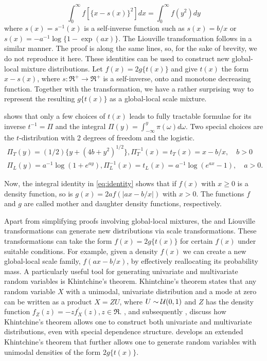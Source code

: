\documentclass[lineno]{biometrika}
\begin{document}
\begin{equation}
  \int_0^\infty f\left[ \{x-s(x)\}^2 \right] dx =  \int_0^\infty f( y^2 ) dy \label{eq:gen}
\end{equation}
where $s(x)=s^{-1}(x)$ is a self-inverse function such as $s(x) = b/x$ or $s(x) = -a^{-1}\log\{1-\exp(a x)\}$. The Liouville transformation follows in a
similar manner.  The proof is along the same lines, so, for the sake of brevity, we do not reproduce it here. These identities can be used to construct new global-local mixture distributions. 
Let $f(x) = 2g\{ t(x) \}$ and give $t(x)$ the form $x-s(x)$, where $s : \Re^+ \to \Re^+$ is a self-inverse, onto and monotone decreasing function. Together with the \CS{} transformation, we have a rather surprising way to represent the resulting $g\{t(x)\}$ as a global-local scale mixture. 

\citet{jones_generating_2014} shows that only a few choices of $t(x)$ leads to fully tractable formulae for its inverse $t^{-1}= \Pi$ and the integral 
$\Pi(y) = \int_{-\infty}^{y} \pi(\omega) d\omega$. Two special choices are the $t$-distribution with 2 degrees of freedom and the logistic. 
\begin{align*}
\Pi_{T}(y) = (1/2)\{ y+(4b+y^2)^{1/2}\}, \Pi_T^{-1}(x) = t_T(x) = x - b/x, \quad b >0\\
\Pi_{L}(y) = a^{-1} \log(1+e^{ay}), \Pi_L^{-1}(x) = t_L(x) = a^{-1} \log(e^{ax}-1), \quad a>0.
\end{align*}

Now, the integral identity in \eqref{eq:identity} shows that if $f(x)$ with $x\geq 0$ is a density function, so is $g(x) = 2a f(|ax-b/x|)$ with $x > 0$.  The functions $f$ and $g$ are called mother and daughter density functions, respectively.  %

Apart from simplifying proofs involving global-local mixtures, the \CS{} and Liouville transformations can generate new distributions via scale transformations. These transformations can take the form $f(x) = 2 g\{ t(x) \}$ 
for certain $f(x)$ under suitable conditions.  
For example, given a density $f(x)$ we can create a new global-local
scale family, $f(a x - b/x)$, by effectively reallocating its probability mass.
A particularly useful tool for generating univariate and multivariate random
variables is Khintchine's theorem.  
Khintchine's theorem states that any random variable $X$ with a unimodal,
univariate distribution and a mode at zero can be written as a product 
$X = Z U$, where $U \sim \mathcal{U}(0,1)$ and $Z$ has the density function 
$f_Z(z) = -z f^{\prime}_{X}(z), z \in \Re$.
\citet{bryson1982constructing}, and subsequently \citet{jones2012khintchine},
discuss how Khintchine's theorem allows one to construct both univariate and
multivariate distributions, even with special dependence structure. \cite{jones_generating_2014} develops an extended Khintchine's theorem that
further allows one to generate random variables with unimodal densities of the
form $2 g\{t(x)\}$. 
\end{document}
